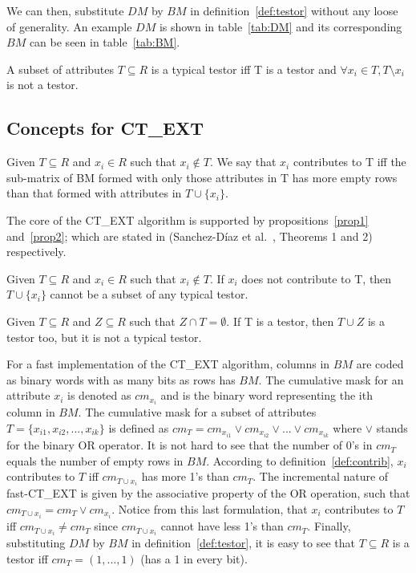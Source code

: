 \documentclass[citeauthoryear]{llncs}
\begin{document}
	We can then, substitute $DM$ by $BM$ in definition~\ref{def:testor} without 
	any loose of generality. An example $DM$ is shown in table~\ref{tab:DM} and
	its corresponding $BM$ can be seen in table~\ref{tab:BM}.
	
	\begin{definition}\label{def:TT}
		A subset of attributes $T \subseteq R$ is a typical testor iff T is a testor and
		$\forall x_i \in T, T \setminus x_i$ is not a testor. 
	\end{definition}	
%	
\subsection{Concepts for CT\_EXT}
%
		
	\begin{definition}\label{def:contrib}
		Given $T \subseteq R$ and $x_i \in R$ such that $x_i \notin T$. We say that $x_i$ contributes to T iff 
		the sub-matrix of BM formed with only those attributes in T has more empty rows than that formed with attributes
		in $T \cup \lbrace x_i \rbrace$.
	\end{definition}	
	
	The core of the CT\_EXT algorithm is supported by propositions~\ref{prop1} and~\ref{prop2}; which are stated in
	(Sanchez-D\'iaz et al.~\cite{Sanchez2010}, Theorems 1 and 2) respectively.
	
	\begin{proposition}\label{prop1} 
		Given $T \subseteq R$ and  $x_i \in R$ such that $x_i \notin T$. If $x_i$ does not contribute to T, then 
		$T\cup\{x_i\}$ cannot be a subset of any typical testor.
	\end{proposition}

	\begin{proposition}\label{prop2} 
		Given $T \subseteq R$ and $Z \subseteq R$ such that $Z \cap T = \emptyset$. If T is a testor, then $T \cup
		Z$ is a 	testor too, but it is not a typical testor.
	\end{proposition}
	
	For a fast implementation of the CT\_EXT algorithm, columns in $BM$ are coded as binary words with as many 
	bits as 	rows has $BM$. The cumulative mask for an attribute $x_i$ is denoted as $cm_{x_i}$ and is the binary
	word representing the ith column in $BM$. The cumulative mask for a subset of attributes $T=\lbrace
	x_{i1},x_{i2},...,x_{ik} \rbrace$ is defined	as $cm_T = cm_{x_{i1}} \vee cm_{x_{i2}} \vee ... \vee cm_{x_{ik}}$
	where $\vee$ stands for the binary OR operator. It is not hard to see that the number of 0's in $cm_T$ equals
	the number of empty rows in $BM$. According to definition~\ref{def:contrib}, $x_i$ contributes to $T$ iff
	$cm_{T\cup x_i}$ has more 1's than $cm_T$. The incremental nature of fast-CT\_EXT is given by the associative
	property of the OR operation, such that $cm_{T\cup x_i}=cm_T\vee cm_{x_i}$. Notice from this last formulation,
	that $x_i$ contributes to $T$ iff $cm_{T\cup x_i}\neq cm_T$ since $cm_{T\cup x_i}$ cannot have less 1's than
	$cm_T$. Finally, substituting $DM$ by $BM$ in definition~\ref{def:testor}, it is easy to see that $T \subseteq
	R$ is a testor iff $cm_T=(1,...,1)$ (has a 1 in every bit).
\end{document}
